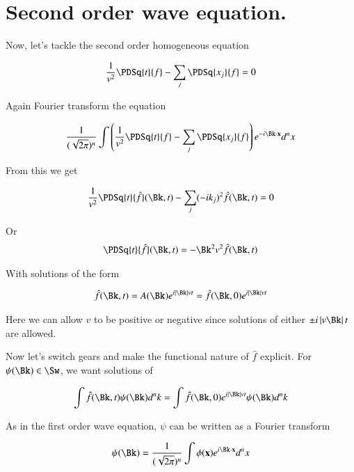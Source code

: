 \section{Second order wave equation. }

Now, let's tackle the second order homogeneous equation

\begin{align}\label{eqn:secondOrderWave}
\inv{v^2} \PDSq{t}{f} - \sum_j \PDSq{x_j}{f} = 0
\end{align}

Again Fourier transform the equation

\begin{align*}
\frac{1}{(\sqrt{2\pi})^n} \int \left( \inv{v^2} \PDSq{t}{f} - \sum_j \PDSq{x_j}{f} \right) e^{-i \Bk \cdot \Bx } d^n x \\
\end{align*}

From this we get 

\begin{align*}
\inv{v^2} \PDSq{t}{\hat{f}}(\Bk,t) - \sum_j (-i k_j)^2 \hat{f}(\Bk,t) = 0
\end{align*}

Or
\begin{align*}
\PDSq{t}{\hat{f}}(\Bk,t) = - \Bk^2 v^2 \hat{f}(\Bk,t) 
\end{align*}

With solutions of the form

\begin{align*}
\hat{f}(\Bk,t) = A(\Bk) e^{i \Abs{\Bk} v t} = \hat{f}(\Bk,0) e^{i \Abs{\Bk} v t}
\end{align*}

Here we can allow $v$ to be positive or negative since solutions of either $\pm i \Abs{v \Bk} t$ are allowed.

Now let's switch gears and make the functional nature of $\hat{f}$ explicit.  For $\psi(\Bk) \in \Sw$, we want solutions
of

\begin{align*}
\int \hat{f}(\Bk,t) \psi(\Bk) d^n k = \int \hat{f}(\Bk,0) e^{i \Abs{\Bk} v t} \psi(\Bk) d^n k 
\end{align*}

As in the first order wave equation, $\psi$ can be written as a Fourier transform 

\begin{align}\label{eqn:fourierWaveTx}
\psi(\Bk) = \frac{1}{(\sqrt{2\pi})^n} \int \phi(\Bx) e^{i \Bk \cdot \Bx } d^n x 
\end{align}

